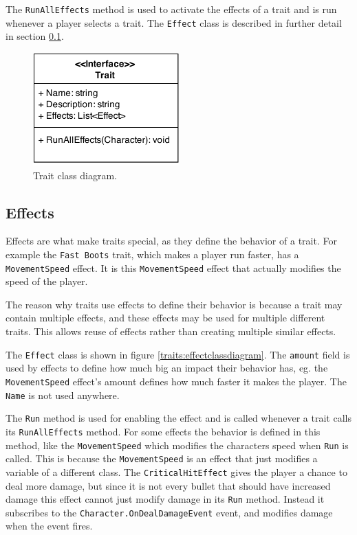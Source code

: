 The \texttt{RunAllEffects} method is used to activate the effects of a trait and is run whenever a player selects a trait.
The \texttt{Effect} class is described in further detail in section \ref{sec:modules:effects}.

\begin{figure}[H]
\centering
\includegraphics[width=0.5\textwidth]{figures/traits/TraitClassDiagram.png}
\caption{Trait class diagram.}
\label{traits:traitclassdiagram}
\end{figure}

\subsection{Effects}
\label{sec:modules:effects}

Effects are what make traits special, as they define the behavior of a trait.
For example the \texttt{Fast Boots} trait, which makes a player run faster, has a \texttt{MovementSpeed} effect.
It is this \texttt{MovementSpeed} effect that actually modifies the speed of the player.

The reason why traits use effects to define their behavior is because a trait may contain multiple effects, and these effects may be used for multiple different traits.
This allows reuse of effects rather than creating multiple similar effects.

The \texttt{Effect} class is shown in figure \ref{traits:effectclassdiagram}.
The \texttt{amount} field is used by effects to define how much big an impact their behavior has, eg. the \texttt{MovementSpeed} effect's amount defines how much faster it makes the player.
The \texttt{Name} is not used anywhere.

The \texttt{Run} method is used for enabling the effect and is called whenever a trait calls its \texttt{RunAllEffects} method.
For some effects the behavior is defined in this method, like the \texttt{MovementSpeed} which modifies the characters speed when \texttt{Run} is called.
This is because the \texttt{MovementSpeed} is an effect that just modifies a variable of a different class.
The \texttt{CriticalHitEffect} gives the player a chance to deal more damage, but since it is not every bullet that should have increased damage this effect cannot just modify damage in its \texttt{Run} method.
Instead it subscribes to the \texttt{Character.OnDealDamageEvent} event, and modifies damage when the event fires.


